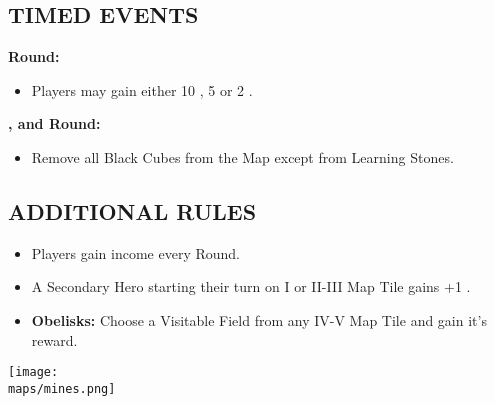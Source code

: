 \begin{multicols*}{2}
\subsection*{\MakeUppercase{Timed Events}}
\textbf{ Round:}
\begin{itemize}
  \item Players may gain either 10 , 5  or 2 .
\end{itemize}
\textbf{,  and  Round:}
\begin{itemize}
  \item Remove all Black Cubes from the Map except from Learning Stones.
\end{itemize}
\subsection*{\MakeUppercase{Additional Rules}}
\begin{itemize}
  \item Players gain income every Round.
  \item A Secondary Hero starting their turn on I or II-III Map Tile gains +1 .
  \item \textbf{Obelisks:} Choose a Visitable Field from any IV-V Map Tile and gain it's reward.
\end{itemize}

\begin{center}
  \vfill
  \texttt{[image: \\maps/mines.png]}
  \vfill
\end{center}

\end{multicols*}
